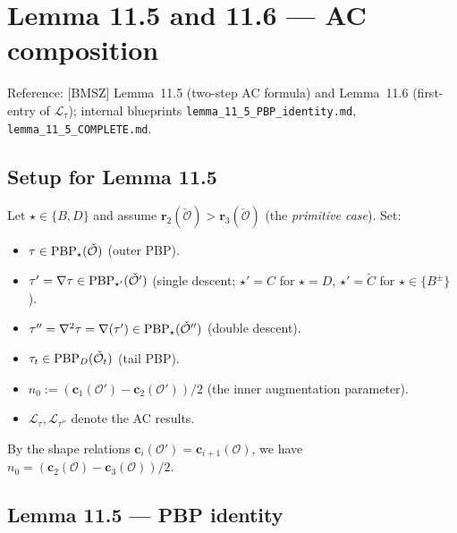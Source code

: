 \chapter{Lemma 11.5 and 11.6 — AC composition}
\label{chap:11_5}

Reference: [BMSZ] Lemma~11.5 (two-step AC formula) and Lemma~11.6 (first-entry
of $\mathcal{L}_\tau$); internal blueprints
\texttt{lemma\_11\_5\_PBP\_identity.md}, \texttt{lemma\_11\_5\_COMPLETE.md}.

\section{Setup for Lemma 11.5}

Let $\star \in \{B, D\}$ and assume $\mathbf{r}_2(\check{\mathcal{O}}) > \mathbf{r}_3(\check{\mathcal{O}})$
(the \emph{primitive case}). Set:
\begin{itemize}
  \item $\tau \in \mathrm{PBP}_\star(\check{\mathcal{O}})$ (outer PBP).
  \item $\tau' = \nabla\tau \in \mathrm{PBP}_{\star'}(\check{\mathcal{O}}')$ (single descent; $\star' = C$ for $\star = D$, $\star' = \tilde{C}$ for $\star \in \{B^\pm\}$).
  \item $\tau'' = \nabla^2\tau = \nabla(\tau') \in \mathrm{PBP}_\star(\check{\mathcal{O}}'')$ (double descent).
  \item $\tau_t \in \mathrm{PBP}_D(\check{\mathcal{O}}_t)$ (tail PBP).
  \item $n_0 := (\mathbf{c}_1(\mathcal{O}') - \mathbf{c}_2(\mathcal{O}')) / 2$ (the inner augmentation parameter).
  \item $\mathcal{L}_\tau, \mathcal{L}_{\tau''}$ denote the AC results.
\end{itemize}

By the shape relations $\mathbf{c}_i(\mathcal{O}') = \mathbf{c}_{i+1}(\mathcal{O})$, we have
$n_0 = (\mathbf{c}_2(\mathcal{O}) - \mathbf{c}_3(\mathcal{O}))/2$.

\section{Lemma 11.5 — PBP identity}

